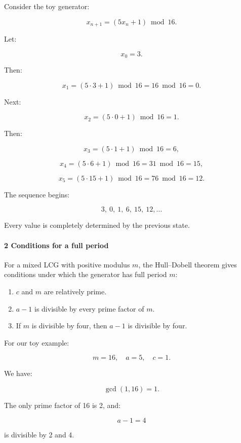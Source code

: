 \hypertarget{02-foundations-ii-ch029-numerical-trace}{}

Consider the toy generator:

\[
 x_{n+1}=(5x_n+1)\bmod16.
\]

Let:

\[
 x_0=3.
\]

Then:

\[
 x_1=(5\cdot3+1)\bmod16=16\bmod16=0.
\]

Next:

\[
 x_2=(5\cdot0+1)\bmod16=1.
\]

Then:

\[
 x_3=(5\cdot1+1)\bmod16=6,
\]

\[
 x_4=(5\cdot6+1)\bmod16=31\bmod16=15,
\]

\[
 x_5=(5\cdot15+1)\bmod16=76\bmod16=12.
\]

The sequence begins:

\[
 3,\ 0,\ 1,\ 6,\ 15,\ 12,\ldots
\]

Every value is completely determined by the previous state.

\paragraph{2 Conditions for a full period}\label{02-foundations-ii-ch029-conditions-for-a-full-period}

\hypertarget{02-foundations-ii-ch029-conditions-for-a-full-period}{}

For a mixed LCG with positive modulus \(m\), the Hull--Dobell theorem gives conditions under which the generator has full period \(m\):

\begin{enumerate}
\def\labelenumi{\arabic{enumi}.}
\tightlist
\item
  \(c\) and \(m\) are relatively prime.
\item
  \(a-1\) is divisible by every prime factor of \(m\).
\item
  If \(m\) is divisible by four, then \(a-1\) is divisible by four.
\end{enumerate}

For our toy example:

\[
 m=16,\quad a=5,\quad c=1.
\]

We have:

\[
 \gcd(1,16)=1.
\]

The only prime factor of 16 is 2, and:

\[
 a-1=4
\]

is divisible by 2 and 4.

